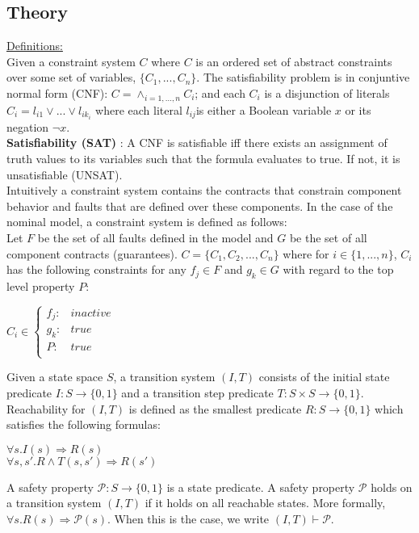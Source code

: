 \subsection{Theory}
\underline{Definitions:} \\

Given a constraint system $C$ where $C$ is an ordered set of abstract constraints over some set of variables, $\{C_1, ..., C_n\}$. The satisfiability problem is in conjuntive normal form (CNF): $C = \land_{i=1,...,n} C_i$; and each $C_i$ is a disjunction of literals $C_i = l_{i1} \lor ... \lor l_{ik_i}$ where each literal $ l_{ij}$is either a Boolean variable $x$ or its negation $\neg x$. \\

\textbf{Satisfiability (SAT)} : A CNF is satisfiable iff there exists an assignment of truth values to its variables such that the formula evaluates to true. If not, it is unsatisfiable (UNSAT). \\

Intuitively a constraint system contains the contracts that constrain component behavior and faults that are defined over these components. In the case of the nominal model, a constraint system is defined as follows: \\

Let $F$ be the set of all faults defined in the model and $G$ be the set of all component contracts (guarantees). $C = \{C_1,C_2,...,C_n\}$ where for $i \in \{1,...,n\}$, $C_i$ has the following constraints for any $f_j \in F$ and $g_k \in G$ with regard to the top level property $P$: \\
\begin{center}
$C_i \in \left\{ \begin{array}{ll}
	f_j :&  inactive\\
	g_k :& true\\
	P :& true\\
\end{array}\right.$	
\end{center}

Given a state space $S$, a transition system $(I,T)$ consists of the initial state predicate $I : S \rightarrow \{0,1\}$ and a transition step predicate $T : S \times S \rightarrow \{0,1\}$. Reachability for $(I,T)$ is defined as the smallest predicate $R : S \rightarrow \{0,1\}$ which satisfies the following formulas:
\begin{center}
$\forall s. I(s) \Rightarrow R(s)$\\
$\forall s, s' .  R \land T(s,s') \Rightarrow R(s')$\\
\end{center}
A safety property $\mathcal{P} : S \to \{0,1\}$ is a state predicate. A safety property $\mathcal{P}$ holds on a transition system $(I,T)$ if it holds on all reachable states. More formally, $\forall s . R(s) \Rightarrow \mathcal{P}(s)$. When this is the case, we write $(I,T) \vdash\mathcal{P}$. 

